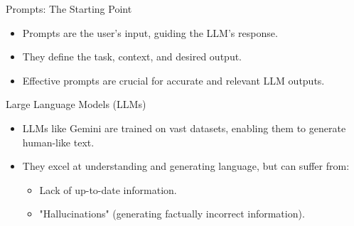 

\begin{frame}{Prompts: The Starting Point}
  \begin{itemize}
    \item Prompts are the user's input, guiding the LLM's response.
    \item They define the task, context, and desired output.
    \item Effective prompts are crucial for accurate and relevant LLM outputs.
  \end{itemize}
\end{frame}

\begin{frame}{Large Language Models (LLMs)}
  \begin{itemize}
    \item LLMs like Gemini are trained on vast datasets, enabling them to generate human-like text.
    \item They excel at understanding and generating language, but can suffer from:
      \begin{itemize}
        \item Lack of up-to-date information.
        \item "Hallucinations" (generating factually incorrect information).
      \end{itemize}
  \end{itemize}
\end{frame}

